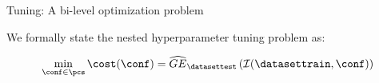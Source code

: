 \begin{frame}{Tuning: A bi-level optimization problem}













\framebreak

We formally state the nested hyperparameter tuning problem as:

$$
    \min_{\conf \in \pcs} \cost(\conf) = \widehat{GE}_{\datasettest}\left(\inducer(\datasettrain, \conf)\right)
$$


\end{frame}
